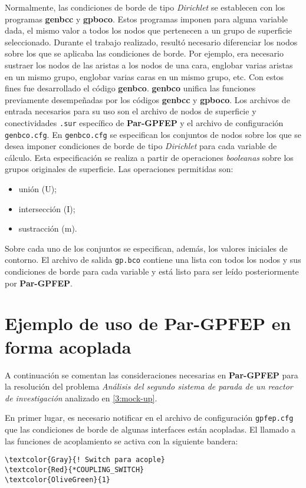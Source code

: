 Normalmente, las condiciones de borde de tipo \textit{Dirichlet} se establecen con los programas \textbf{genbcc} y \textbf{gpboco}.
Estos programas imponen para alguna variable dada, el mismo valor a todos los nodos que pertenecen a un grupo de superficie seleccionado.
Durante el trabajo realizado, resultó necesario diferenciar los nodos sobre los que se aplicaba las condiciones de borde.
Por ejemplo, era necesario sustraer los nodos de las aristas a los nodos de una cara, englobar varias aristas en un mismo grupo, englobar varias caras en un mismo grupo, etc.
Con estos fines fue desarrollado el código \textbf{genbco}.
\textbf{genbco} unifica las funciones previamente desempeñadas por los códigos \textbf{genbcc} y \textbf{gpboco}.
Los archivos de entrada necesarios para su uso son el archivo de nodos de superficie y conectividades \texttt{.sur} específico de \textbf{Par-GPFEP}
y el archivo de configuración \texttt{genbco.cfg}.
En \texttt{genbco.cfg} se especifican los conjuntos de nodos sobre los que se desea imponer condiciones de borde de tipo \textit{Dirichlet} para cada variable de cálculo.
Esta especificación se realiza a partir de operaciones \textit{booleanas} sobre los grupos originales de superficie.
Las operaciones permitidas son:
\begin{itemize}
\item unión (U);
\item intersección (I);
\item sustracción (m).
\end{itemize}
Sobre cada uno de los conjuntos se especifican, además, los valores iniciales de contorno.
El archivo de salida \texttt{gp.bco} contiene una lista con todos los nodos y sus condiciones de borde para cada variable y está listo para ser leído posteriormente por \textbf{Par-GPFEP}.


\section{Ejemplo de uso de \textbf{Par-GPFEP} en forma acoplada}
\label{pargpfep-coup}

A continuación se comentan las consideraciones necesarias en \textbf{Par-GPFEP}
para la resolución del problema \textit{Análisis del segundo sistema de parada de un reactor de investigación} analizado en \ref{3:mock-up}.

En primer lugar, es necesario notificar en el archivo de configuración \texttt{gpfep.cfg} que las condiciones de borde de algunas interfaces están acopladas.
El llamado a las funciones de acoplamiento se activa con la siguiente bandera:
\begin{Verbatim}[frame=single,commandchars=\\\{\}]
\textcolor{Gray}{! Switch para acople}
\textcolor{Red}{*COUPLING_SWITCH}
\textcolor{OliveGreen}{1}
\end{Verbatim}

